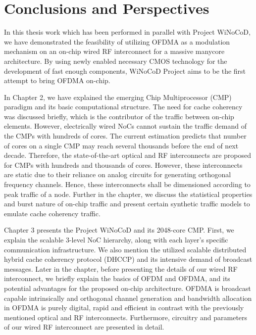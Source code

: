 
\chapter{Conclusions and Perspectives} %


\label{Chapter8} %


In this thesis work which has been performed in parallel with Project WiNoCoD, we have demonstrated the feasibility of utilizing OFDMA as a modulation mechanism on an on-chip wired RF interconnect for a massive manycore architecture. By using newly enabled necessary CMOS technology for the development of fast enough components, WiNoCoD Project aims to be the first attempt to bring OFDMA on-chip. 

In Chapter 2, we have explained the emerging Chip Multiprocessor (CMP) paradigm and its basic computational structure. The need for cache coherency was discussed briefly, which is the contributor of the traffic between on-chip elements. However, electrically wired NoCs cannot sustain the traffic demand of the CMPs with hundreds of cores. The current estimation predicts that number of cores on a single CMP may reach several thousands before the end of next decade. Therefore, the state-of-the-art optical and RF interconnects are proposed for CMPs with hundreds and thousands of cores. However, these interconnects are static due to their reliance on analog circuits for generating orthogonal frequency channels. Hence, these interconnects shall be dimensioned according to peak traffic of a node. Further in the chapter, we discuss the statistical properties and burst nature of on-chip traffic and present certain synthetic traffic models to emulate cache coherency traffic.

Chapter 3 presents the Project WiNoCoD and its 2048-core CMP. First, we explain the scalable 3-level NoC hierarchy, along with each layer's specific communication infrastructure. We also mention the utilized scalable distributed hybrid cache coherency protocol (DHCCP) and its intensive demand of broadcast messages. Later in the chapter, before presenting the details of our wired RF interconnect, we briefly explain the basics of OFDM and OFDMA, and its potential advantages for the proposed on-chip architecture. OFDMA is broadcast capable intrinsically and orthogonal channel generation and bandwidth allocation in OFDMA is purely digital, rapid and efficient in contrast with the previously mentioned optical and RF interconnects. Furthermore, circuitry and parameters of our wired RF interconnect are presented in detail.

